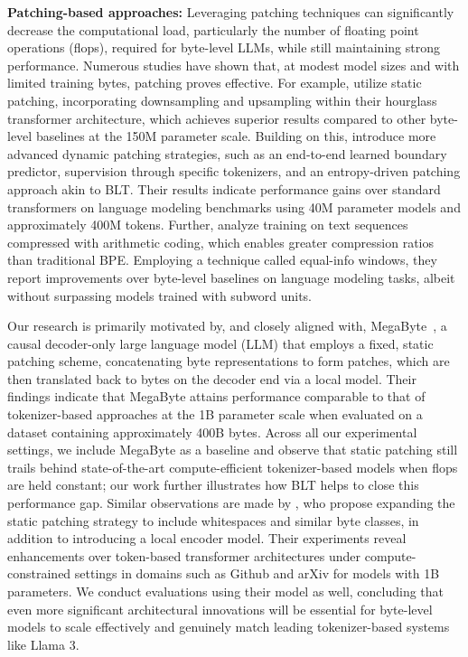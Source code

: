 \textbf{Patching-based approaches:} Leveraging patching techniques can significantly decrease the computational load, particularly the number of floating point operations (flops), required for byte-level LLMs, while still maintaining strong performance. Numerous studies have shown that, at modest model sizes and with limited training bytes, patching proves effective. For example, \cite{nawrot-etal-2022-hierarchical} utilize static patching, incorporating downsampling and upsampling within their hourglass transformer architecture, which achieves superior results compared to other byte-level baselines at the 150M parameter scale. Building on this, \cite{nawrot-etal-2023-efficient} introduce more advanced dynamic patching strategies, such as an end-to-end learned boundary predictor, supervision through specific tokenizers, and an entropy-driven patching approach akin to {\textsc BLT}. Their results indicate performance gains over standard transformers on language modeling benchmarks using 40M parameter models and approximately 400M tokens. Further, \cite{lester2024training} analyze training on text sequences compressed with arithmetic coding, which enables greater compression ratios than traditional BPE. Employing a technique called equal-info windows, they report improvements over byte-level baselines on language modeling tasks, albeit without surpassing models trained with subword units.

Our research is primarily motivated by, and closely aligned with, MegaByte~\citep{yu2023megabyte}, a causal decoder-only large language model (LLM) that employs a fixed, static patching scheme, concatenating byte representations to form patches, which are then translated back to bytes on the decoder end via a local model. Their findings indicate that MegaByte attains performance comparable to that of tokenizer-based approaches at the 1B parameter scale when evaluated on a dataset containing approximately 400B bytes. Across all our experimental settings, we include MegaByte as a baseline and observe that static patching still trails behind state-of-the-art compute-efficient tokenizer-based models when flops are held constant; our work further illustrates how {\textsc BLT} helps to close this performance gap. Similar observations are made by \cite{slagle2024spacebyte}, who propose expanding the static patching strategy to include whitespaces and similar byte classes, in addition to introducing a local encoder model. Their experiments reveal enhancements over token-based transformer architectures under compute-constrained settings in domains such as Github and arXiv for models with 1B parameters. We conduct evaluations using their model as well, concluding that even more significant architectural innovations will be essential for byte-level models to scale effectively and genuinely match leading tokenizer-based systems like Llama 3.

